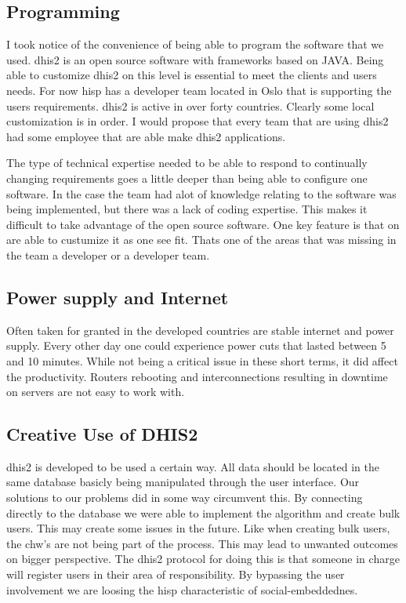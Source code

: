 \subsection{Programming}
I took notice of the convenience of being able to program the software that we used.
\gls{dhis2} is an open source software with frameworks based on JAVA. 
Being able to customize \gls{dhis2} on this level is essential to meet the clients and users needs.
For now \gls{hisp} has a developer team located in Oslo that is supporting the users requirements.
\gls{dhis2} is active in over forty countries. 
Clearly some local customization is in order. 
I would propose that every team that are using \gls{dhis2} had some employee that are able make  \gls{dhis2} applications. 

The type of technical expertise needed to be able to respond to continually changing requirements goes a little deeper than being able to configure one software. 
In the case the team had alot of knowledge relating to the software was being implemented, but there was a lack of coding expertise.
This makes it difficult to take advantage of the open source software. 
One key feature is that on are able to custumize it as one see fit. 
Thats one of the areas that was missing in the team a developer or a developer team.

\subsection{Power supply and Internet}
Often taken for granted in the developed countries are stable internet and power supply.
Every other day one could experience power cuts that lasted between 5 and  10 minutes.
While not being a critical issue in these short terms, it did affect the productivity. 
Routers rebooting and interconnections resulting in downtime on servers are not easy to work with.


\subsection{Creative Use of DHIS2}
\gls{dhis2} is developed to be used a certain way. All data should be located in the same database basicly being manipulated through the user interface.
Our solutions to our problems did in some way circumvent this.
By connecting directly to the database we were able to implement the algorithm and create bulk users.
This may create some issues in the future. 
Like when creating bulk users, the \gls{chw}'s are not being part of the process. 
This may lead to unwanted outcomes on bigger perspective. 
The \gls{dhis2} protocol for doing this is that someone in charge will register users in their area of responsibility.
By bypassing the user involvement we are loosing the \gls{hisp} characteristic of social-embeddednes. 


